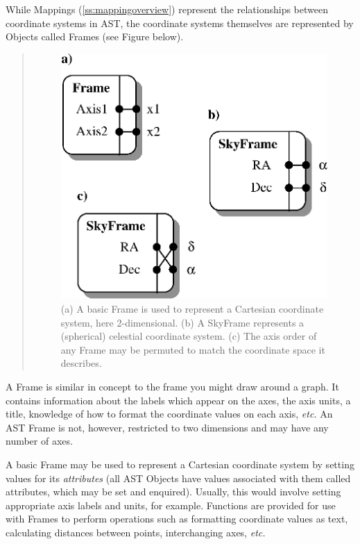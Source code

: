 \documentclass[twoside,11pt]{article}
\newcommand{\secref}[1]{\S\ref{#1}}
\renewcommand{\secref}[1]{\ref{#1}}
\begin{document}
\begin{htmlonly}
   While Mappings (\secref{ss:mappingoverview}) represent the
   relationships between coordinate systems in AST, the coordinate
   systems themselves are represented by Objects called Frames (see
   Figure below).
   \begin{quote}
   \begin{figure}
   \label{fig:frames}
   \includegraphics[scale=1.5]{sun211_figures/frames.eps}
   \caption{(a) A basic Frame is used to represent a Cartesian coordinate
   system, here 2-dimensional. (b) A SkyFrame represents a (spherical)
   celestial coordinate system. (c) The axis order of any Frame may be
   permuted to match the coordinate space it describes.}
   \end{figure}
   \end{quote}
\end{htmlonly}
A Frame is similar in concept to the frame you might draw around a
graph.  It contains information about the labels which appear on the
axes, the axis units, a title, knowledge of how to format the
coordinate values on each axis, {\em{etc.}}  An AST Frame is not,
however, restricted to two dimensions and may have any number of axes.

A basic Frame may be used to represent a Cartesian coordinate system
by setting values for its {\em attributes} (all AST Objects have
values associated with them called attributes, which may be set and
enquired).  Usually, this would involve setting appropriate axis
labels and units, for example.  Functions are provided for use with
Frames to perform operations such as formatting coordinate values as
text, calculating distances between points, interchanging axes,
{\em{etc.}}
\end{document}
